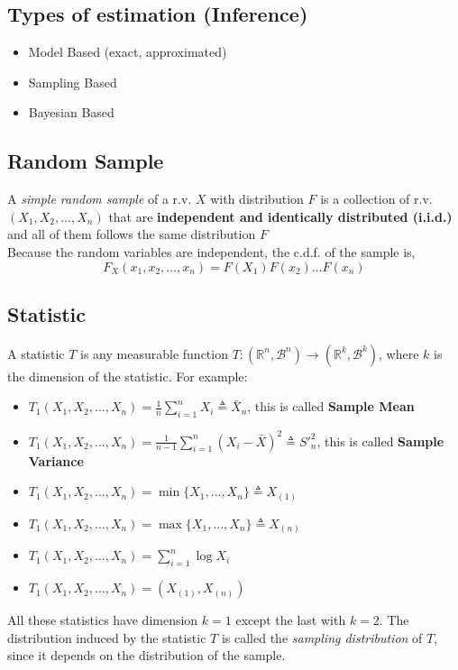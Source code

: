 \subsection{Types of estimation (Inference)}
\begin{itemize}
    \item Model Based (exact, approximated)
    \item Sampling Based
    \item Bayesian Based
\end{itemize}

\subsection{Random Sample}
A \textit{simple random sample} of a r.v. $X$ with distribution $F$ is a collection of r.v. $(X_1, X_2,\dots,X_n)$ that are 
\textbf{independent and identically distributed (i.i.d.)} and all of them follows the same distribution $F$\\

Because the random variables are independent, the c.d.f. of the sample is,
\[ F_X(x_1,x_2,\dots,x_n) = F(X_1)F(x_2)\dots F(x_n) \]

\subsection{Statistic}
A statistic $T$ is any measurable function $T: (\mathbb{R}^n,\mathcal{B}^n) \rightarrow (\mathbb{R}^k,\mathcal{B}^k)$, where $k$ 
is the dimension of the statistic. For example:
\begin{itemize}
    \item $T_1(X_1,X_2,\dots,X_n) = \frac{1}{n}\sum_{i=1}^{n}X_i \triangleq \bar{X}_n$, this is called \textbf{Sample Mean}
    \item $T_1(X_1,X_2,\dots,X_n) = \frac{1}{n-1}\sum_{i=1}^{n} (X_i-\bar{X})^2 \triangleq S'^2_n$, this is called \textbf{Sample Variance}
    \item $T_1(X_1,X_2,\dots,X_n) = \min \{ X_1,\dots,X_n \} \triangleq X_{(1)}$
    \item $T_1(X_1,X_2,\dots,X_n) = \max \{ X_1,\dots,X_n \} \triangleq X_{(n)}$
    \item $T_1(X_1,X_2,\dots,X_n) = \sum_{i=1}^{n} \log{X_i}$
    \item $T_1(X_1,X_2,\dots,X_n) = (X_{(1)}, X_{(n)})$
\end{itemize} 
All these statistics have dimension $k=1$ except the last with $k=2$. The distribution induced by the statistic $T$ is called the 
\textit{sampling distribution} of $T$, since it depends on the distribution of the sample.

